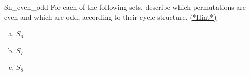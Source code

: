 
\begin{exercise}{Sn_even_odd}
For each of the following sets, describe which permutations are even and which are odd, according to their cycle structure.
\hyperref[sec:permute:hints]{(*Hint*)}
\begin{multicols}{3}
\begin{enumerate}[(a)]
\item
$S_6$
\item
$S_7$
\item
$S_8$
\end{enumerate}
\end{multicols}
\end{exercise}

